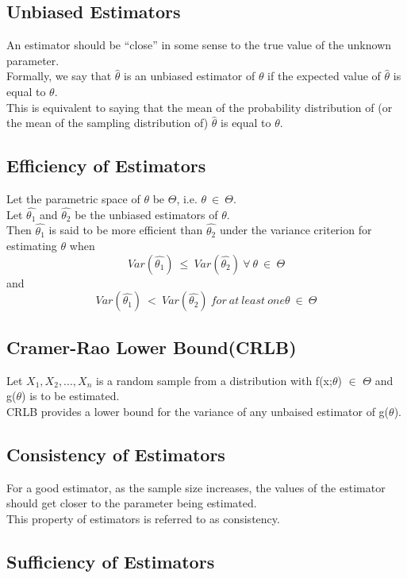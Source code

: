 \subsection*{Unbiased Estimators}
An estimator should be “close” in some sense to the true value of
the unknown parameter.\\
Formally, we say that $\hat{\theta}$ is an unbiased estimator of $\theta$ if the expected value of $\hat{\theta}$ is equal to $\theta$.\\
This is equivalent to saying that the mean of the probability
distribution of (or the mean of the sampling distribution of) $\hat{\theta}$ is equal to $\theta$.

\subsection*{Efficiency of Estimators}
Let the parametric space of $\theta$ be $\Theta$, i.e. $\theta \ \in \  \Theta$.\\
Let $\hat{\theta_1}$ and $\hat{\theta_2}$ be the unbiased estimators of ${\theta}$.\\
Then $\hat{\theta_1}$ is said to be more efficient than $\hat{\theta_2}$ under the variance criterion for estimating $\theta$ when 
\[
Var(\hat{\theta_1})\ \leq\ Var(\hat{\theta_2})\ \forall\ \theta\ \in \ \Theta\]
and
\[
Var(\hat{\theta_1})\ <\ Var(\hat{\theta_2})\ for\ at\ least\ one \theta\ \in \ \Theta\]

\subsection*{Cramer{-}Rao Lower Bound(CRLB)}
Let $X_1,X_2,...,X_n$ is a random sample from a distribution with f(x;$\theta$) $\in$ $\Theta$ and g($\theta$) is to be estimated.\\
CRLB provides a lower bound for the variance of any unbaised estimator of g($\theta$).

\subsection*{Consistency of Estimators}
For a good estimator, as the sample size increases, the values of the
estimator should get closer to the parameter being estimated.\\
This property of estimators is referred to as consistency.

\subsection*{Sufficiency of Estimators}
